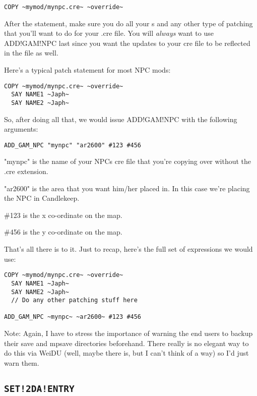 \documentclass{article}
\def\ttref#1{\ahrefloc{#1}{\tt #1}}
\def\t#1{{\tt #1}}
\begin{document}
\begin{verbatim}
COPY ~mymod/mynpc.cre~ ~override~
\end{verbatim}

After the \ttref{COPY} statement, make sure you do all your \ttref{SAY}s
and any other type of patching that you'll want to do for your .cre file.
You will \emph{always} want to use ADD!GAM!NPC last since you want the
updates to your cre file to be reflected in the \ttref{GAM} file as well.

Here's a typical patch statement for most NPC mods:

\begin{verbatim}
COPY ~mymod/mynpc.cre~ ~override~
  SAY NAME1 ~Japh~
  SAY NAME2 ~Japh~
\end{verbatim}

So, after doing all that, we would issue ADD!GAM!NPC with the following
arguments:

\begin{verbatim}
ADD_GAM_NPC "mynpc" "ar2600" #123 #456
\end{verbatim}

"mynpc" is the name of your NPCs cre file that you're copying over without
the .cre extension.

"ar2600" is the area that you want him/her placed in.  In this case we're
placing the NPC in Candlekeep.

\#123 is the x co-ordinate on the map.

\#456 is the y co-ordinate on the map.

That's all there is to it.  Just to recap, here's the full set of
expressions we would use:

\begin{verbatim}
COPY ~mymod/mynpc.cre~ ~override~
  SAY NAME1 ~Japh~
  SAY NAME2 ~Japh~
  // Do any other patching stuff here

ADD_GAM_NPC ~mynpc~ ~ar2600~ #123 #456
\end{verbatim}

Note: Again, I have to stress the importance of warning the end users to
backup their save and mpsave directories beforehand.  There really is no
elegant way to do this via WeiDU (well, maybe there is, but I can't think
of a way) so I'd just warn them.

\subsection{\t{SET!2DA!ENTRY}}
\end{document}
